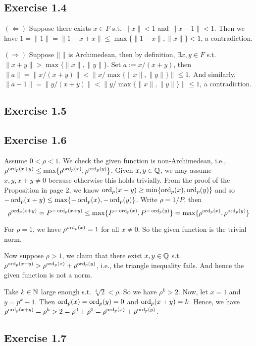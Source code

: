 \documentclass[../Koblitz.tex]{subfiles}
\begin{document}
\subsection*{Exercise 1.4}

$(\Leftarrow)$ Suppose there exists $x\in F$ s.t. $\|x\| < 1$ and $\|x-1\| < 1$. Then we have $1=\|1\|=\|1-x+x\|\leq \max\{\|1-x\|,\|x\|\} < 1$, a contradiction.

$(\Rightarrow)$ Suppose $\|\;\|$ is Archimedean, then by definition, $\exists x,y\in F$ s.t. $\|x+y\|>\max\{ \|x\|,\|y\|\}$. Set $a:=x/(x+y)$, then $\|a\|=\|x/(x+y)\| < \|x/\max\{ \|x\|,\|y\|\} \| \leq 1$. And similarly, $\|a-1\|=\|y/(x+y)\| < \|y/\max\{ \|x\|,\|y\|\} \| \leq 1$, a contradiction.

\subsection*{Exercise 1.5}

\subsection*{Exercise 1.6}

Assume $0<\rho<1$. We check the given function is non-Archimedean, i.e., $\rho^{\operatorname{ord}_p(x+y)}\leq \max\{\rho^{\operatorname{ord}_p(x)},\rho^{\operatorname{ord}_p(y)}\}$. Given $x,y\in\mathbb{Q}$, we may assume $x,y,x+y\neq0$ because otherwise this holds trivially. From the proof of the Proposition in page 2, we know $\operatorname{ord}_p(x+y) \geq \min\{\operatorname{ord}_p(x),\operatorname{ord}_p(y)\}$ and so $-\operatorname{ord}_p(x+y) \leq \max\{-\operatorname{ord}_p(x),-\operatorname{ord}_p(y)\}$. Write $\rho=1/P$, then $$\rho^{\operatorname{ord}_p(x+y)} = P^{-\operatorname{ord}_p(x+y)} \leq \max\{P^{-\operatorname{ord}_p(x)},P^{-\operatorname{ord}_p(y)}\} = \max\{\rho^{\operatorname{ord}_p(x)},\rho^{\operatorname{ord}_p(y)}\}$$

For $\rho=1$, we have $\rho^{\operatorname{ord}_p(x)}=1$ for all $x\neq0$. So the given function is the trivial norm.

Now suppose $\rho>1$, we claim that there exist $x,y\in\mathbb{Q}$ s.t. $\rho^{\operatorname{ord}_p(x+y)} > \rho^{\operatorname{ord}_p(x)}+\rho^{\operatorname{ord}_p(y)}$, i.e., the triangle inequality fails. And hence the given function is not a norm.

Take $k\in\mathbb{N}$ large enough s.t. $\sqrt[k]{2}<\rho$. So we have $\rho^k>2$. Now, let $x=1$ and $y=p^k-1$. Then $\operatorname{ord}_p(x)=\operatorname{ord}_p(y)=0$ and $\operatorname{ord}_p(x+y)=k$. Hence, we have $\rho^{\operatorname{ord}_p(x+y)} = \rho^k >2 = \rho^0 + \rho^0 = \rho^{\operatorname{ord}_p(x)}+\rho^{\operatorname{ord}_p(y)}$.

\subsection*{Exercise 1.7}
\end{document}
